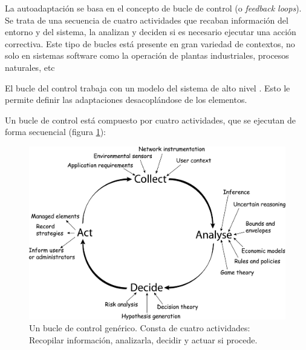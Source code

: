 La autoadaptación se basa en el concepto de bucle de control (o \emph{feedback loops}). Se trata de una secuencia de cuatro actividades que recaban información del entorno y del sistema, la analizan y deciden si es necesario ejecutar una acción correctiva.  Este tipo de bucles está presente en gran variedad de contextos, no solo en sistemas software como la operación de plantas industriales, procesos naturales, etc

El bucle del control trabaja con un modelo del sistema de alto nivel \cite{garlanIncreasingSystemDependability2003}. Esto le permite definir las adaptaciones desacoplándose de los elementos.

Un bucle de control está compuesto por cuatro actividades, que se ejecutan de forma secuencial (figura \ref{fig:bucle-control}):

\begin{figure}[h]
  \centering
  \includegraphics[scale=0.07]{01_introduccion/images/feedback-loop}
  \caption[Un bucle de control genérico. Consta de cuatro actividades: Recopilar información, analizarla, decidir y actuar si procede.]{Un bucle de control genérico. Consta de cuatro actividades: Recopilar información, analizarla, decidir y actuar si procede. \cite{dobsonSurveyAutonomicCommunications2006}}
  \label{fig:bucle-control}
\end{figure}

